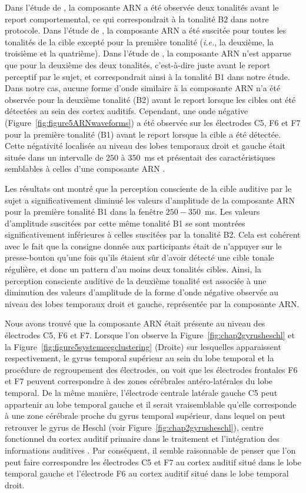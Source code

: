 Dans l'étude de \cite{gutschalk2008neural}, la composante ARN a été observée deux tonalités avant le report comportemental, ce qui correspondrait à la tonalité B2 dans notre protocole. 
Dans l'étude de \cite{wiegand2012correlates}, la composante ARN a été suscitée pour toutes les tonalités de la cible excepté pour la première tonalité (\textit{i.e.}, la deuxième, la troisième et la quatrième). 
Dans l'étude de \cite{giani2015detecting}, la composante ARN n'est apparue que pour la deuxième des deux tonalités, c'est-à-dire juste avant le report perceptif par le sujet, et correspondrait ainsi à la tonalité B1 dans notre étude. 
Dans notre cas, aucune forme d'onde similaire à la composante ARN n'a été observée pour la deuxième tonalité (B2) avant le report lorsque les cibles ont été détectées au sein des cortex auditifs. 
Cependant, une onde négative (Figure~\ref{fig:figure5ARNwaveforms}) a été observée sur les électrodes C5, F6 et F7 pour la première tonalité (B1) avant le report lorsque la cible a été détectée. 
Cette négativité localisée au niveau des lobes temporaux droit et gauche était située dans un intervalle de $250$ à $350$~ms et présentait des caractéristiques semblables à celles d'une composante ARN \citep{giani2015detecting}. 

Les résultats ont montré que la perception consciente de la cible auditive par le sujet a significativement diminué les valeurs d'amplitude de la composante ARN pour la première tonalité B1 dans la fenêtre $250-350$~ms. 
Les valeurs d'amplitude suscitées par cette même tonalité B1 se sont montrées significativement inférieures à celles suscitées par la tonalité B2. 
Cela est cohérent avec le fait que la consigne donnée aux participants était de n'appuyer sur le presse-bouton qu'une fois qu'ils étaient sûr d'avoir détecté une cible tonale régulière, et donc un pattern d'au moins deux tonalités cibles. 
Ainsi, la perception consciente auditive de la deuxième tonalité est associée à une diminution des valeurs d'amplitude de la forme d'onde négative observée au niveau des lobes temporaux droit et gauche, représentée par la composante ARN. 

Nous avons trouvé que la composante ARN était présente au niveau des électrodes C5, F6 et F7. 
Lorsque l'on observe la Figure~\ref{fig:chap2gyrusheschl} et la Figure~\ref{fig:figure5systemeegclustering} (Droite) sur lesquelles apparaissent respectivement, le gyrus temporal supérieur au sein du lobe temporal et la procédure de regroupement des électrodes, on voit que les électrodes frontales F6 et F7 peuvent correspondre à des zones cérébrales antéro-latérales du lobe temporal. 
De la même manière, l'électrode centrale latérale gauche C5 peut appartenir au lobe temporal gauche et il serait vraisemblable qu'elle corresponde à une zone cérébrale proche du gyrus temporal supérieur, dans lequel on peut retrouver le gyrus de Heschl (voir Figure~\ref{fig:chap2gyrusheschl}), centre fonctionnel du cortex auditif primaire dans le traitement et l'intégration des informations auditives \citep{beauchamp2004integration, brugge2009coding}. 
Par conséquent, il semble raisonnable de penser que l'on peut faire correspondre les électrodes C5 et F7 au cortex auditif situé dans le lobe temporal gauche et l'électrode F6 au cortex auditif situé dans le lobe temporal droit. 


